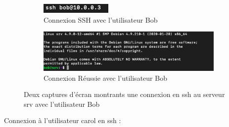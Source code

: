 \documentclass[12pt]{article}
\begin{document}
\vspace{0.3cm}

\begin{figure}[h]
  \centering
  \begin{subfigure}{0.30\textwidth}
    \centering
    \includegraphics[width=\textwidth]{Images-Client-SSH/Image-TD-SSH-1/SSH-Bob.png}
    \caption{Connexion SSH avec l'utilisateur Bob}
  \end{subfigure}
  \vspace{0.9cm} %
  \begin{subfigure}{0.45\textwidth}
    \centering
    \includegraphics[width=\textwidth]{Images-Client-SSH/Image-TD-SSH-1/Connexion-SSH-Bob.png}
    \caption{Connexion Réussie avec l'utilisateur Bob}
  \end{subfigure}
  \caption{Deux captures d'écran montrants une connexion en ssh au serveur srv avec l'utilisateur Bob}
\end{figure}

\vspace{0.3cm}

Connexion à l'utilisateur carol en ssh  : 

\vspace{0.3cm}
\end{document}
